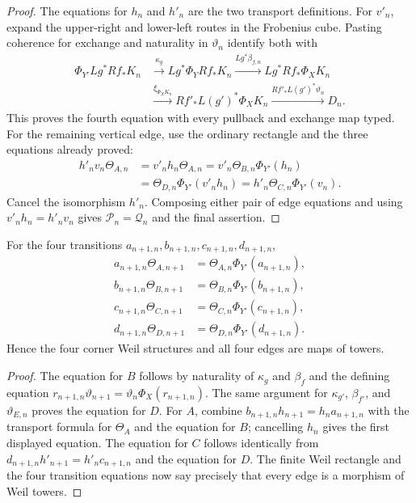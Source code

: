 \begin{proof}

The equations for $h_n$ and $h'_n$ are the two transport definitions.  For
$v'_n$, expand the upper-right and lower-left routes in the Frobenius cube.
Pasting coherence for exchange and naturality in $\vartheta_n$ identify both
with
\[
\begin{aligned}
 \Phi_{Y'}Lg^*Rf_*K_n
 &\xrightarrow{\kappa_g}Lg^*\Phi_YRf_*K_n
 \xrightarrow{Lg^*\beta_{f,n}}Lg^*Rf_*\Phi_XK_n\\
 &\xrightarrow{\xi_{\Phi_XK_n}}Rf'_*L(g')^*\Phi_XK_n
 \xrightarrow{Rf'_*L(g')^*\vartheta_n}D_n.
\end{aligned}
\]
This proves the fourth equation with every pullback and exchange map typed.
For the remaining vertical edge, use the ordinary rectangle and the three
equations already proved:
\[
\begin{aligned}
 h'_nv_n\Theta_{A,n}
 &=v'_nh_n\Theta_{A,n}
 =v'_n\Theta_{B,n}\Phi_{Y'}(h_n)\\
 &=\Theta_{D,n}\Phi_{Y'}(v'_nh_n)
 =h'_n\Theta_{C,n}\Phi_{Y'}(v_n).
\end{aligned}
\]
Cancel the isomorphism $h'_n$.  Composing either pair of edge equations and
using $v'_nh_n=h'_nv_n$ gives
$\mathcal P_n=\mathcal Q_n$ and the final assertion.
\end{proof}

\begin{lemma}
\label{lemma:weil-pbc-frobenius-tower-compatibility}
For the four transitions $a_{n+1,n},b_{n+1,n},c_{n+1,n},d_{n+1,n}$,
\[
\begin{aligned}
 a_{n+1,n}\Theta_{A,n+1}
 &=\Theta_{A,n}\Phi_{Y'}(a_{n+1,n}),\\
 b_{n+1,n}\Theta_{B,n+1}
 &=\Theta_{B,n}\Phi_{Y'}(b_{n+1,n}),\\
 c_{n+1,n}\Theta_{C,n+1}
 &=\Theta_{C,n}\Phi_{Y'}(c_{n+1,n}),\\
 d_{n+1,n}\Theta_{D,n+1}
 &=\Theta_{D,n}\Phi_{Y'}(d_{n+1,n}).
\end{aligned}
\]
Hence the four corner Weil structures and all four edges are maps of towers.
\end{lemma}
\begin{proof}

The equation for $B$ follows by naturality of $\kappa_g$ and $\beta_f$ and
the defining equation
$r_{n+1,n}\vartheta_{n+1}=\vartheta_n\Phi_X(r_{n+1,n})$.
The same argument for $\kappa_{g'}$, $\beta_{f'}$, and
$\vartheta_{E,n}$ proves the equation for $D$.  For $A$, combine
$b_{n+1,n}h_{n+1}=h_na_{n+1,n}$ with the transport formula for
$\Theta_A$ and the equation for $B$; cancelling $h_n$ gives the first
displayed equation.  The equation for $C$ follows identically from
$d_{n+1,n}h'_{n+1}=h'_nc_{n+1,n}$ and the equation for $D$.  The finite Weil
rectangle and the four transition equations now say precisely that every
edge is a morphism of Weil towers.
\end{proof}

